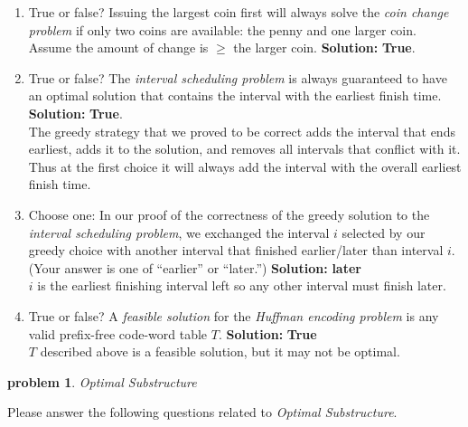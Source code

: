 \documentclass[10pt]{article}
\newcommand{\solution}[1]{\color{blue}\hfill\break\noindent\textbf{Solution:} #1\color{black}}
\newtheorem{problem}{\sc\color{cit}problem}
\begin{document}
\begin{enumerate}
\renewcommand{\theenumi}{\Alph{enumi}}

\item True or false? Issuing the largest coin first will always solve the \emph{coin change problem} if only two coins are available: the penny and one larger coin. Assume the amount of change is $\geq$ the larger coin.
\solution{
    \textbf{True}.
}

\item True or false? The \emph{interval scheduling problem} is always guaranteed to have an optimal solution that contains the interval with the earliest finish time.
\solution{
    \textbf{True}. \\
    The greedy strategy that we proved to be correct adds the interval that ends earliest, adds it to the solution, and removes all intervals that conflict with it. Thus at the first choice it will always add the interval with the overall earliest finish time.
}

\item Choose one: In our proof of the correctness of the greedy solution to the \emph{interval scheduling problem}, we exchanged the interval $i$ selected by our greedy choice with another interval that finished earlier/later than interval $i$. (Your answer is one of ``earlier'' or ``later.'')
\solution{
    \textbf{later} \\
    $i$ is the earliest finishing interval left so any other interval must finish later.
}

\item True or false? A \emph{feasible solution} for the \emph{Huffman encoding problem} is any valid prefix-free code-word table $T$.
\solution{
    \textbf{True} \\
    $T$ described above is a feasible solution, but it may not be optimal.
}
\end{enumerate}


\begin{problem}Optimal Substructure\end{problem}
Please answer the following questions related to \emph{Optimal Substructure}.
\end{document}
